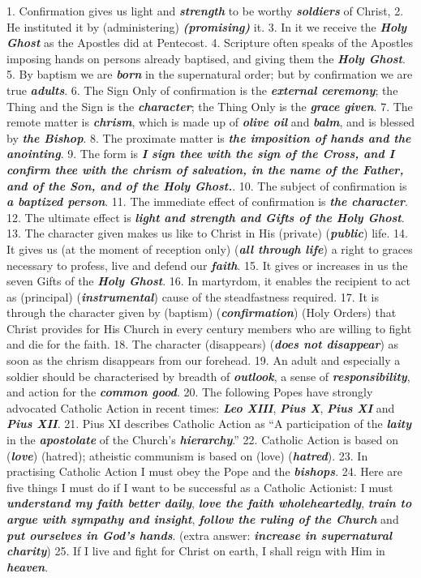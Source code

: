 \documentclass[a5paper]{article}
\newcommand\answer[1]{\textbf{\textit{#1}}}
\newcounter{z}
\begin{document}
1. Confirmation gives us light and \answer{strength} to be worthy \answer{soldiers}  of  Christ, 
2.
He instituted it by (administering) \answer{(promising)} it.
3. In it we receive  the
\answer{Holy Ghost} as the Apostles did at Pentecost.
4. Scripture  often  speaks  of  the
Apostles imposing hands on persons already baptised,  and  giving  them  the
\answer{Holy Ghost}.
5. By baptism  we  are  \answer{born}  in  the  supernatural  order;  but  by
confirmation we are true \answer{adults}.
6. The Sign  Only  of  confirmation  is  the
\answer{external ceremony}; the Thing and the Sign is the \answer{character}; the Thing Only is the \answer{grace given}. 
7.
The remote matter is \answer{chrism}, which is made up of  \answer{olive oil}  and  \answer{balm},  and  is
blessed by \answer{the Bishop}.
8. The proximate matter is \answer{the imposition of hands and the anointing}.
9. The  form  is  \answer{I sign thee with the sign of the Cross, and I confirm thee with the chrism of salvation, in the name of the Father, and of the Son, and of the Holy Ghost.}.
10. The subject of confirmation  is  \answer{a baptized person}. 
11.  The  immediate  effect  of
confirmation is \answer{the character}.
12. The ultimate effect is \answer{light and strength and Gifts of the Holy Ghost}.
13.  The  character
given makes us like to Christ in His (private) (\answer{public}) life.
14.  It  gives
us (at the moment of reception only) (\answer{all through life}) a  right  to  graces
necessary to profess, live and defend our \answer{faith}.
15. It gives  or  increases
in us the seven Gifts of  the  \answer{Holy Ghost}. 
16.  In  martyrdom,  it  enables  the
recipient to act as (principal) (\answer{instrumental}) cause  of  the  steadfastness
required.
17. It is through the character given by (baptism)  (\answer{confirmation})
(Holy Orders) that Christ provides for His Church in every  century  members
who are  willing  to  fight  and  die  for  the  faith. 
18.  The  character
(disappears) (\answer{does not disappear}) as soon as the chrism disappears from  our
forehead.
19. An adult and especially a soldier should be  characterised  by
breadth of \answer{outlook}, a sense of \answer{responsibility},  and  action  for  the  \answer{common good}. 
20.  The
following Popes have strongly advocated Catholic  Action  in  recent  times:
\answer{Leo XIII}, \answer{Pius X}, \answer{Pius XI} and \answer{Pius XII}.
21. Pius XI describes Catholic Action  as  “A
participation of the  \answer{laity}  in  the  \answer{apostolate}  of  the  Church's  \answer{hierarchy}.” 
22.
Catholic Action is based on (\answer{love}) (hatred); atheistic  communism  is  based
on (love) (\answer{hatred}).
23. In practising Catholic Action I must obey  the  Pope
and the \answer{bishops}.
24. Here  are  five  things  I  must  do  if  I  want  to  be
successful as a Catholic Actionist: I must \answer{understand my faith better daily}, \answer{love the faith wholeheartedly},  \answer{train to argue with sympathy and insight},  \answer{follow the ruling of the Church}  and
\answer{put  ourselves in God's hands}. (extra answer: \answer{increase in supernatural charity})
25. If I live and fight for Christ on earth, I shall reign  with  Him
in \answer{heaven}.
\end{document}
